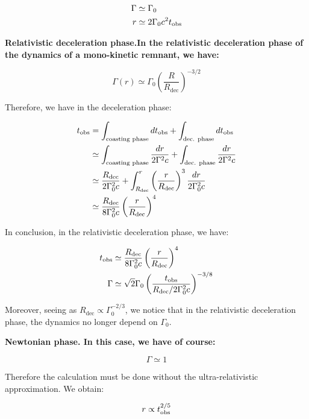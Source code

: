 \begin{align}\label{coasting}
    \Gamma &\simeq \Gamma_0 \\
    r &\simeq 2 \Gamma_0 c^2 t_{\mathrm{obs}}
\end{align}

\bf{Relativistic deceleration phase.}In the relativistic deceleration phase of the dynamics of a mono-kinetic remnant, we have:

\begin{equation}\Gamma(r) \simeq \Gamma_0 \left( \frac{R}{R_{\text{dec}}} \right)^{-3/2}\end{equation}


Therefore, we have in the deceleration phase:

\begin{align}
    t_{\mathrm{obs}} &= \int_{\text{coasting phase}} dt_{\mathrm{obs}} + \int_{\text{dec. phase}} dt_{\mathrm{obs}} \\
          &\simeq \int_{\text{coasting phase}} \frac{dr}{2\Gamma^2 c} + \int_{\text{dec. phase}} \frac{dr}{2\Gamma^2 c} \\
          &\simeq \frac{R_\text{dec}}{2\Gamma_0^2 c} + \int_{R_{\text{dec}}}^{r} \left( \frac{r}{R_{\text{dec}}} \right)^3 \frac{dr}{2\Gamma_0^2 c} \\
          &\simeq \frac{R_{\text{dec}}}{8\Gamma_0^2 c}\left( \frac{r}{R_{\text{dec}}} \right)^4
\end{align}

In conclusion, in the relativistic deceleration phase, we have:

\begin{align}
    t_{\mathrm{obs}} &\simeq \frac{R_{\text{dec}}}{8\Gamma_0^2 c}\left( \frac{r}{R_{\text{dec}}} \right)^4 \\
    \Gamma &\simeq \sqrt{2} \Gamma_0 \left( \frac{t_{\mathrm{obs}}}{R_{\text{dec}}/2\Gamma_0^2c} \right)^{-3/8}
\end{align}

Moreover, seeing as $R_{\text{dec}} \propto \Gamma_0^{-2/3}$, we notice that in the relativistic deceleration phase, the dynamics no longer depend on $\Gamma_0$.

\bf{Newtonian phase.} In this case, we have of course:

\begin{equation}
    \Gamma \simeq 1
\end{equation}

Therefore the calculation must be done without the ultra-relativistic approximation. We obtain:

\begin{equation}
    r \propto t_{\mathrm{obs}}^{2/5}
\end{equation}\\


